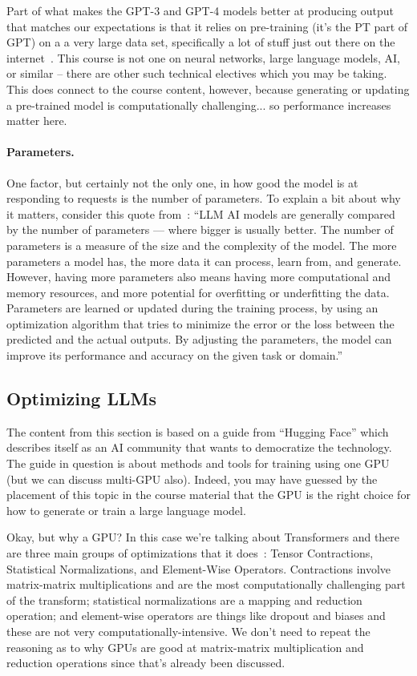 Part of what makes the GPT-3 and GPT-4 models better at producing output that matches our expectations is that it relies on pre-training (it's the PT part of GPT) on a a very large data set, specifically a lot of stuff just out there on the internet~\cite{gptforgood}. This course is not one on neural networks, large language models, AI, or similar -- there are other such technical electives which you may be taking. This does connect to the course content, however, because generating or updating a pre-trained model is computationally challenging... so performance increases matter here.

\paragraph{Parameters.} One factor, but certainly not the only one, in how good the model is at responding to requests is the number of parameters. To explain a bit about why it matters, consider this quote from~\cite{msllm}: ``LLM AI models are generally compared by the number of parameters — where bigger is usually better. The number of parameters is a measure of the size and the complexity of the model. The more parameters a model has, the more data it can process, learn from, and generate. However, having more parameters also means having more computational and memory resources, and more potential for overfitting or underfitting the data. Parameters are learned or updated during the training process, by using an optimization algorithm that tries to minimize the error or the loss between the predicted and the actual outputs. By adjusting the parameters, the model can improve its performance and accuracy on the given task or domain.''

\subsection*{Optimizing LLMs}
The content from this section is based on a guide from ``Hugging Face'' which describes itself as an AI community that wants to democratize the technology. The guide in question is about methods and tools for training using one GPU~\cite{hf} (but we can discuss multi-GPU also). Indeed, you may have guessed by the placement of this topic in the course material that the GPU is the right choice for how to generate or train a large language model. 

Okay, but why a GPU? In this case we're talking about Transformers and there are three main groups of optimizations that it does~\cite{hf2}: Tensor Contractions, Statistical Normalizations, and Element-Wise Operators. Contractions involve matrix-matrix multiplications and are the most computationally challenging part of the transform; statistical normalizations are a mapping and reduction operation; and element-wise operators are things like dropout and biases and these are not very computationally-intensive. We don't need to repeat the reasoning as to why GPUs are good at matrix-matrix multiplication and reduction operations since that's already been discussed. 

